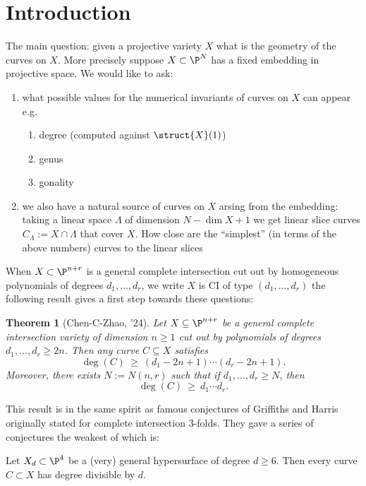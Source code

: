 \documentclass[12pt]{article}
\theoremstyle{plain}
\newtheorem{Lthm}{Theorem}
\begin{document}
\newpage

\section{Introduction}

The main question: given a projective variety $X$ what is the geometry of the curves on $X$. More precisely suppose $X \subset \P^N$ has a fixed embedding in projective space. We would like to ask:
\begin{enumerate}
\item what possible values for the numerical invariants of curves on $X$ can appear e.g.
\begin{enumerate}
\item degree (computed against $\struct{X}(1)$)
\item genus 
\item gonality
\end{enumerate}
\item we also have a natural source of curves on $X$ arsing from the embedding: taking a linear space $\Lambda$ of dimension $N - \dim{X}+1$ we get linear slice curves $C_\Lambda := X \cap \Lambda$ that cover $X$. {\color{red} How close are the ``simplest'' (in terms of the above numbers) curves to the linear slices}
\end{enumerate}
When $X \subset \P^{n+r}$ is a general complete intersection cut out by homogeneous polynomials of degrees $d_1, \dots, d_r$, we write $X$ is CI of type $(d_1, \dots, d_r)$ the following result gives a first step towards these questions:

\begin{Lthm}[Chen-C-Zhao, '24]
Let $X \subseteq \P^{n+r}$ be a general complete intersection variety of dimension $n \geq 1$ cut out by polynomials of degrees $d_{1}, \ldots, d_{r} \geq 2n$. Then any curve $C \subseteq X$ satisfies
\[ \deg(C)\ \ge\ (d_1 - 2n + 1) \cdots (d_r - 2n + 1) .\]
Moreover, there exists $N := N(n,r)$ such that if $d_1, \dots, d_r \ge N$, then
\[ \deg(C)\ \ge\ d_1 \cdots d_r. \]
\end{Lthm}

This result is in the same spirit as famous conjectures of Griffiths and Harris originally stated for complete intersection 3-folds. They gave a series of conjectures the weakest of which is:

\begin{conj}
Let $X_d \subset \P^4$ be a (very) general hypersurface of degree $d \ge 6$. Then every curve $C \subset X$ has degree divisible by $d$. 
\end{conj}
\end{document}
